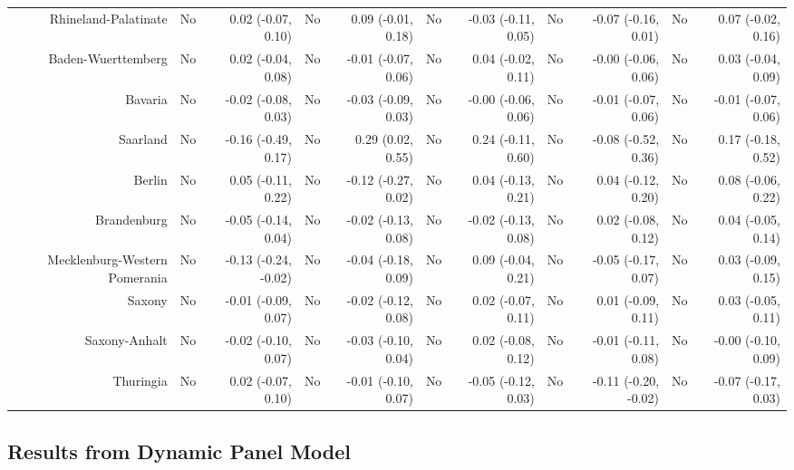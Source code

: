 \documentclass[
  man,floatsintext]{apa6}
\newenvironment{lltable}{\begin{landscape}\centering\begin{ThreePartTable}}{\end{ThreePartTable}\end{landscape}}
\begin{document}
\begin{lltable}
{\begin{longtable}{rrrrrrrrrrr}
Rhineland-Palatinate & No & 0.02 (-0.07, 0.10) & No & 0.09 (-0.01, 0.18) & No & -0.03 (-0.11, 0.05) & No & -0.07 (-0.16, 0.01) & No & 0.07 (-0.02, 0.16)\\
Baden-Wuerttemberg & No & 0.02 (-0.04, 0.08) & No & -0.01 (-0.07, 0.06) & No & 0.04 (-0.02, 0.11) & No & -0.00 (-0.06, 0.06) & No & 0.03 (-0.04, 0.09)\\
Bavaria & No & -0.02 (-0.08, 0.03) & No & -0.03 (-0.09, 0.03) & No & -0.00 (-0.06, 0.06) & No & -0.01 (-0.07, 0.06) & No & -0.01 (-0.07, 0.06)\\
Saarland & No & -0.16 (-0.49, 0.17) & No & 0.29 (0.02, 0.55) & No & 0.24 (-0.11, 0.60) & No & -0.08 (-0.52, 0.36) & No & 0.17 (-0.18, 0.52)\\
Berlin & No & 0.05 (-0.11, 0.22) & No & -0.12 (-0.27, 0.02) & No & 0.04 (-0.13, 0.21) & No & 0.04 (-0.12, 0.20) & No & 0.08 (-0.06, 0.22)\\
Brandenburg & No & -0.05 (-0.14, 0.04) & No & -0.02 (-0.13, 0.08) & No & -0.02 (-0.13, 0.08) & No & 0.02 (-0.08, 0.12) & No & 0.04 (-0.05, 0.14)\\
Mecklenburg-Western Pomerania & No & -0.13 (-0.24, -0.02) & No & -0.04 (-0.18, 0.09) & No & 0.09 (-0.04, 0.21) & No & -0.05 (-0.17, 0.07) & No & 0.03 (-0.09, 0.15)\\
Saxony & No & -0.01 (-0.09, 0.07) & No & -0.02 (-0.12, 0.08) & No & 0.02 (-0.07, 0.11) & No & 0.01 (-0.09, 0.11) & No & 0.03 (-0.05, 0.11)\\
Saxony-Anhalt & No & -0.02 (-0.10, 0.07) & No & -0.03 (-0.10, 0.04) & No & 0.02 (-0.08, 0.12) & No & -0.01 (-0.11, 0.08) & No & -0.00 (-0.10, 0.09)\\
Thuringia & No & 0.02 (-0.07, 0.10) & No & -0.01 (-0.10, 0.07) & No & -0.05 (-0.12, 0.03) & No & -0.11 (-0.20, -0.02) & No & -0.07 (-0.17, 0.03)\\
\bottomrule
\end{longtable}

}

\end{lltable}

\subsection{Results from Dynamic Panel Model}\label{results-from-dynamic-panel-model}
\end{document}
